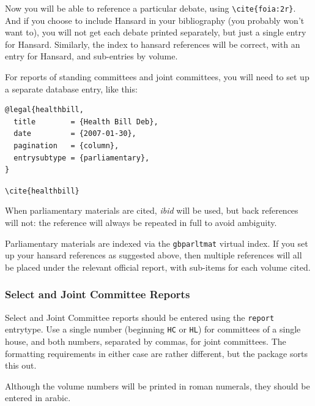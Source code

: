 \documentclass[a4paper,
               11pt,
	       DIV=1,			   
	       footinclude=false]
	      {scrartcl}
\newcounter{egcounter}\setcounter{egcounter}{0}
\newlength{\boxwidth}
\newenvironment{bibexample}[1][]
{%
  \medskip\par\noindent\ignorespaces
  \marginpar{[\refstepcounter{egcounter}\arabic{egcounter}]\label{#1}}%
  \setlength{\boxwidth}{0.95\linewidth}%
  \addtolength{\boxwidth}{-2\fboxsep}
  \addtolength{\boxwidth}{-2\fboxrule}
  \begin{lrbox}{\boxcontainer}
  \begin{minipage}[t]{\boxwidth}%
}
{%
  \end{minipage}\end{lrbox}%
  \colorbox{gray!30}{\usebox{\boxcontainer}}
  \par\medskip}
\newcommand{\egcite}[1]{{\texttt{\textbackslash cite#1}}}
\begin{document}
Now you will be able to reference a particular debate, using
\verb|\cite{foia:2r}|. And if you choose to include Hansard in your
bibliography (you probably won't want to), you will not get each
debate printed separately, but just a single entry for
Hansard. Similarly, the index to hansard references will be correct,
with an entry for Hansard, and sub-entries by volume.

For reports of standing committees and joint committees, you will need
to set up a separate database entry, like this:

\begin{bibexample}[healthbill]
\begin{verbatim}
@legal{healthbill,
  title        = {Health Bill Deb},
  date         = {2007-01-30},
  pagination   = {column},
  entrysubtype = {parliamentary},
}
\end{verbatim}
\end{bibexample}

\begin{description}
\item[\egcite{\{healthbill\}}] \cite{healthbill}
\end{description}

When parliamentary materials are cited, \emph{ibid} will be used, but
back references will not: the reference will always be repeated in
full to avoid ambiguity.

Parliamentary materials are indexed via the \texttt{gbparltmat}
virtual index. If you set up your hansard references as suggested
above, then multiple references will all be placed under the relevant
official report, with sub-items for each volume cited.

\subsubsection{Select and Joint Committee Reports}

Select and Joint Committee reports should be entered using the
\texttt{report} entrytype. Use a single number (beginning \texttt{HC}
or \texttt{HL}) for committees of a single house, and both numbers,
separated by commas, for joint committees. The formatting requirements
in either case are rather different, but the package sorts this out.

Although the volume numbers will be printed in roman
numerals, they should be entered in arabic.
\end{document}
